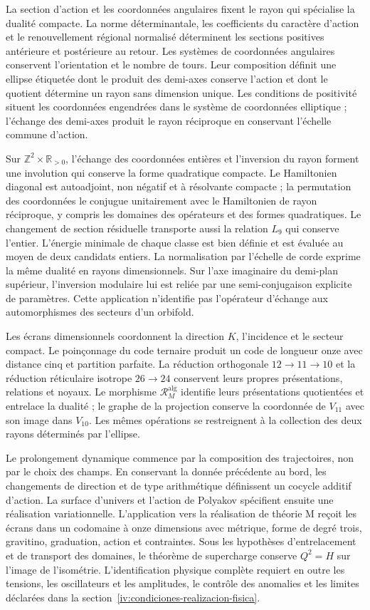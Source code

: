 La section d’action et les coordonnées angulaires fixent le rayon qui
spécialise la dualité compacte. La norme déterminantale, les
coefficients du caractère d’action et le renouvellement régional normalisé
déterminent les sections positives antérieure et postérieure au retour.
Les systèmes de coordonnées angulaires conservent l’orientation et le nombre de tours.
Leur composition définit une ellipse étiquetée dont le produit des demi-axes
conserve l’action et dont le quotient détermine un rayon sans dimension
unique. Les conditions de positivité situent les coordonnées engendrées
dans le système de coordonnées elliptique ; l’échange des demi-axes produit le rayon
réciproque en conservant l’échelle commune d’action.

Sur \(\mathbb Z^2\times\mathbb R_{>0}\), l’échange des
coordonnées entières et l’inversion du rayon forment une involution
qui conserve la forme quadratique compacte. Le Hamiltonien diagonal est
autoadjoint, non négatif et à résolvante compacte ; la permutation des
coordonnées le conjugue unitairement avec le Hamiltonien de rayon
réciproque, y compris les domaines des opérateurs et des formes quadratiques.
Le changement de section résiduelle transporte aussi la relation \(L_9\)
qui conserve l’entier. L’énergie minimale de chaque classe est bien
définie et est évaluée au moyen de deux candidats entiers. La normalisation
par l’échelle de corde exprime la même dualité en rayons
dimensionnels. Sur l’axe imaginaire du demi-plan supérieur, l’inversion
modulaire lui est reliée par une semi-conjugaison explicite
de paramètres. Cette application n’identifie pas l’opérateur d’échange aux
automorphismes des secteurs d’un orbifold.

Les écrans dimensionnels coordonnent la direction \(K\), l’incidence
et le secteur compact. Le poinçonnage du code ternaire produit un
code de longueur onze avec distance cinq et partition parfaite.
La réduction orthogonale \(12\to11\to10\) et la réduction réticulaire
isotrope \(26\to24\) conservent leurs propres présentations, relations
et noyaux. Le morphisme \(\mathcal R_M^{\mathrm{alg}}\) identifie leurs
présentations quotientées et entrelace la dualité ; le graphe de la
projection conserve la coordonnée de \(V_{11}\) avec son image
dans \(V_{10}\). Les mêmes opérations se restreignent à la collection des
deux rayons déterminés par l’ellipse.

Le prolongement dynamique commence par la composition des trajectoires,
non par le choix des champs. En conservant la donnée précédente au
bord, les changements de direction et de type arithmétique définissent un
cocycle additif d’action. La surface d’univers et l’action de
Polyakov spécifient ensuite une réalisation variationnelle. L’application
vers la réalisation de théorie M reçoit les écrans dans un codomaine
à onze dimensions avec métrique, forme de degré trois, gravitino, graduation,
action et contraintes. Sous les hypothèses d’entrelacement et de
transport des domaines, le théorème de supercharge conserve \(Q^2=H\)
sur l’image de l’isométrie. L’identification physique complète
requiert en outre les tensions, les oscillateurs et les amplitudes, le contrôle
des anomalies et les limites déclarées dans la
section~\ref{iv:condiciones-realizacion-fisica}.

